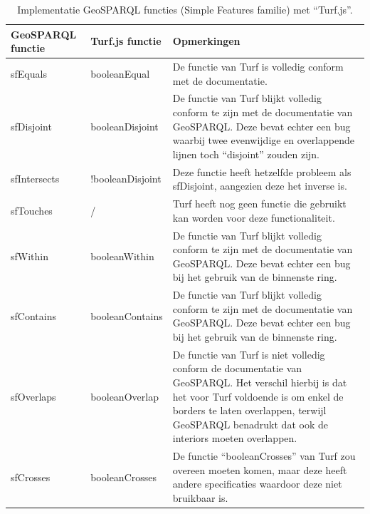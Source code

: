 \begin{table}[ht]
    \centering
    \begin{tabular}{ |p{2cm}|p{2cm}|p{8cm}| } 
        \hline
        \rowcolor{TableHeaderColor} GeoSPARQL functie & Turf.js functie & Opmerkingen \\ \hline
        
        \rowcolor{TableColor} sfEquals & booleanEqual & De functie van Turf is volledig conform met de documentatie. \\ \hline

        \rowcolor{TableColor} sfDisjoint & booleanDisjoint & De functie van Turf blijkt volledig conform te zijn met de documentatie van GeoSPARQL. Deze bevat echter een bug waarbij twee evenwijdige en overlappende lijnen toch ``disjoint'' zouden zijn. \\ \hline

        \rowcolor{TableColor} sfIntersects & !booleanDisjoint & Deze functie heeft hetzelfde probleem als sfDisjoint, aangezien deze het inverse is. \\ \hline

        \rowcolor{TableColor} sfTouches & / & Turf heeft nog geen functie die gebruikt kan worden voor deze functionaliteit. \\ \hline

        \rowcolor{TableColor} sfWithin & booleanWithin & De functie van Turf blijkt volledig conform te zijn met de documentatie van GeoSPARQL. Deze bevat echter een bug bij het gebruik van de binnenste ring. \\ \hline

        \rowcolor{TableColor} sfContains & booleanContains & De functie van Turf blijkt volledig conform te zijn met de documentatie van GeoSPARQL. Deze bevat echter een bug bij het gebruik van de binnenste ring. \\ \hline

        \rowcolor{TableColor} sfOverlaps & booleanOverlap & De functie van Turf is niet volledig conform de documentatie van GeoSPARQL. Het verschil hierbij is dat het voor Turf voldoende is om enkel de borders te laten overlappen, terwijl GeoSPARQL benadrukt dat ook de interiors moeten overlappen. \\ \hline

        \rowcolor{TableColor} sfCrosses & booleanCrosses & De functie ``booleanCrosses'' van Turf zou overeen moeten komen, maar deze heeft andere specificaties waardoor deze niet bruikbaar is.  \\ \hline
    \end{tabular}
    \caption{Implementatie GeoSPARQL functies (Simple Features familie) met ``Turf.js''.}
    \label{tab:turf_functions}
\end{table}